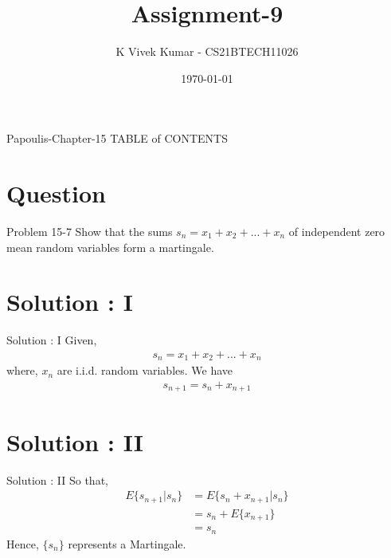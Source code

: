 \documentclass{beamer}
\title{Assignment-9}
\author{K Vivek Kumar - CS21BTECH11026}
\date{\today}
\begin{document}
\begin{frame}
    \titlepage 
\end{frame}

\logo{}


\begin{frame}{Papoulis-Chapter-15}
TABLE of CONTENTS
    \tableofcontents
\end{frame}


\section{Question}
\begin{frame}{Problem 15-7}
Show that the sums $s_n = x_1 + x_2 + ... + x_n$ of independent zero mean random variables form a martingale. 
\end{frame}


\section{Solution : I}
\begin{frame}{Solution : I}
Given,
	\begin{align}
	s_n = x_1 + x_2 + ... + x_n
	\end{align}
	where, $x_n$ are i.i.d. random variables. We have
	\begin{align}
	s_{n+1} = s_n + x_{n+1}
	\end{align}
\end{frame} 
\section{Solution : II}
\begin{frame}{Solution : II}
	So that,
	\begin{align}
	E\{s_{n+1}|s_{n}\}&=E\{s_{n}+x_{n+1}|s_{n}\}\\
	&=s_{n}+E\{x_{n+1}\}\\
	&=s_n
	\end{align}
	Hence, $\{s_n\}$ represents a Martingale.
\end{frame} 
\end{document}
